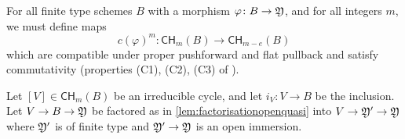 \documentclass[a4paper,12pt]{article} %
\theoremstyle{definition}
\theoremstyle{plain}%
\renewcommand{\phi}{\varphi}
\newcommand{\Chow}{\mathsf{CH}}
\newcommand{\jocomment}[1]{}
\begin{document}
For all finite type schemes $B$ with a morphism $\phi\colon B \to \frak Y$, and for all integers $m$, we must define maps
\[c(\phi)^{m}\colon \Chow_m(B) \to \Chow_{m-e}(B) \]
which are compatible under proper pushforward and flat pullback and satisfy commutativity (properties (C1), (C2), (C3) of \cite[Section 17.1]{Fulton1984Intersection-th}).



Let $[V] \in \Chow_m(B)$ be an irreducible cycle, and let $i_V\colon V \to B$ be the inclusion. Let $V \to B \to \frak Y$ be factored as in \cref{lem:factorisationopenquasi} into $V \to \frak Y' \to \frak Y$ where $\frak Y'$ is of finite type and $\frak Y' \to \frak Y$ is an open immersion. 
\end{document}
